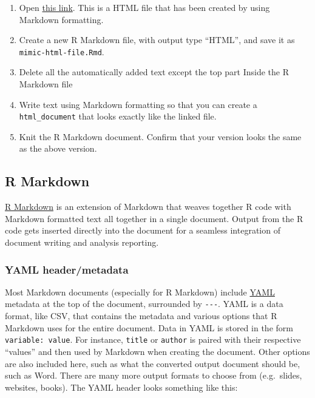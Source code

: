 \documentclass[]{Nemilov}
\providecommand{\tightlist}{%
  \setlength{\itemsep}{0pt}\setlength{\parskip}{0pt}}
\begin{document}
\begin{enumerate}
\def\labelenumi{\arabic{enumi}.}
\tightlist
\item
  Open \href{https://htmlpreview.github.io/?https://github.com/merely-useful/merely-useful.github.io/blob/book/includes/r-reproducibility/exercise.html}{this link}.
  This is a HTML file that has been created by using
  Markdown formatting.
\item
  Create a new R Markdown file, with output type ``HTML'', and save it as
  \texttt{mimic-html-file.Rmd}.
\item
  Delete all the automatically added text except the top part Inside the R Markdown file
\item
  Write text using Markdown formatting so that you
  can create a \texttt{html\_document} that looks exactly like the linked file.
\item
  Knit the R Markdown document. Confirm that your version looks the same as the above version.
\end{enumerate}

\hypertarget{r-markdown}{%
\subsection{R Markdown}\label{r-markdown}}

\href{https://rmarkdown.rstudio.com/}{R Markdown} is an extension of Markdown that weaves together R code
with Markdown formatted text all together in a single document. Output from the
R code gets inserted directly into the document for a seamless integration of
document writing and analysis reporting.

\hypertarget{yaml-headermetadata}{%
\subsubsection{YAML header/metadata}\label{yaml-headermetadata}}

Most Markdown documents (especially for R Markdown) include \href{https://bookdown.org/yihui/rmarkdown/html-document.html}{YAML} metadata at
the top of the document, surrounded by \texttt{-\/-\/-}. YAML is a data format, like CSV,
that contains the metadata and various options that R Markdown uses for the
entire document. Data in YAML is stored in the form \texttt{variable:\ value}. For
instance, \texttt{title} or \texttt{author} is paired with their respective ``values'' and then
used by Markdown when creating the document. Other options are also included
here, such as what the converted output document should be, such as Word. There
are many more output formats to choose from (e.g.~slides, websites, books). The
YAML header looks something like this:
\end{document}
